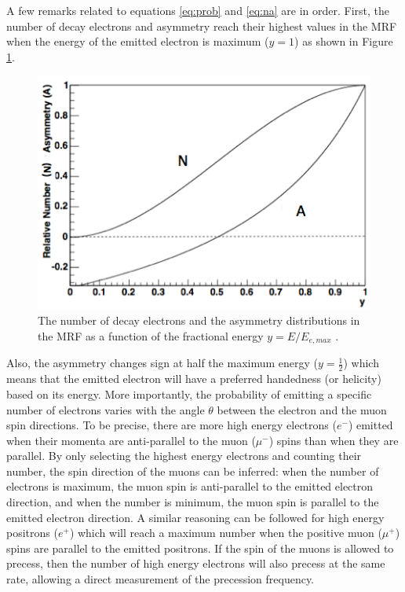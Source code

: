 \documentclass{outhesis}
\begin{document}
A few remarks related to equations \ref{eq:prob} and \ref{eq:na} are in order. First, the number of decay electrons and asymmetry reach their highest values in the MRF when the energy of the emitted electron is maximum ($y=1$) as shown in Figure \ref{fig:CMF}.
 \begin{figure}
    \centering
  \includegraphics[scale=0.5]{figures/CMF}
   \caption[Decay electrons and asymmetry distributions in the muon rest frame]{The number of decay electrons and the asymmetry distributions in the MRF as a function of the fractional energy $y=E/E_{e,max}$ \cite{bnl}.}
  \label{fig:CMF}
\end{figure}
Also, the asymmetry changes sign at half the maximum energy ($y=\frac{1}{2}$) which means that the emitted electron will have a preferred handedness (or helicity) based on its energy. More importantly, the probability of emitting a specific number of electrons varies with the angle $\theta$ between the electron and the muon spin directions. To be precise, there are more high energy electrons ($e^-$) emitted when their momenta are anti-parallel to the muon ($\mu^-$) spins than when they are parallel. By only selecting the highest energy electrons and counting their number, the spin direction of the muons can be inferred: when the number of electrons is maximum, the muon spin is anti-parallel to the emitted electron direction, and when the number is minimum, the muon spin is parallel to the emitted electron direction. A similar reasoning can be followed for high energy positrons ($e^+$) which will reach a maximum number when the positive muon ($\mu^+$) spins are parallel to the emitted positrons. If the spin of the muons is allowed to precess, then the number of high energy electrons will also precess at the same rate, allowing a direct measurement of the precession frequency. 
\end{document}
